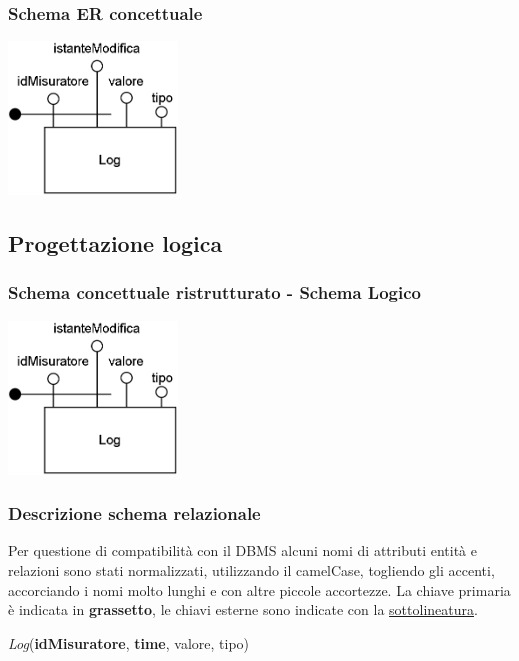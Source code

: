 \subsubsection{Schema ER concettuale}

\begin{center}
    \includegraphics[width=4.5cm]{contenuti/specifica-basi-dati/img-sbd/logging_concettuale.png}
\end{center}

\subsection{Progettazione logica}

\subsubsection{Schema concettuale ristrutturato - Schema Logico}

\begin{center}
    \includegraphics[width=4.5cm]{contenuti/specifica-basi-dati/img-sbd/logging_logico.png}
\end{center}

\subsubsection{Descrizione schema relazionale}

Per questione di compatibilità con il DBMS alcuni nomi di attributi entità e relazioni sono stati normalizzati, utilizzando il camelCase, togliendo gli accenti, accorciando i nomi molto lunghi e con altre piccole accortezze.
La chiave primaria è indicata in \textbf{grassetto}, le chiavi esterne sono indicate con la \underline{sottolineatura}.

\textit{Log}(\textbf{idMisuratore}, \textbf{time}, valore, tipo)
